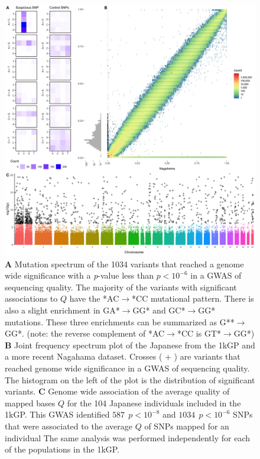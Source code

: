 \documentclass[9pt,lineno]{elife}
\begin{document}
\begin{figure}
\includegraphics[width=\hsize,keepaspectratio]{./Figures/Figure1.jpg}
\caption{
\textbf{A} 
Mutation spectrum of the 1034 variants that reached a genome wide significance with a \textit{p}-value less than $p < 10^{-6}$  in a GWAS of sequencing quality. 
The majority of the variants with significant associations to $Q$ have the *AC${\rightarrow}$*CC mutational pattern. There is also a slight enrichment in GA*${\rightarrow}$GG* and GC*${\rightarrow}$GG* mutations. These three enrichments can be summarized as G**${\rightarrow}$GG*. (note: the reverse complement of *AC${\rightarrow}$*CC is GT*${\rightarrow}$GG*)
\textbf{B} 
Joint frequency spectrum plot of the Japanese from the 1kGP and a more recent Nagahama dataset.
Crosses ( + ) are variants that reached genome wide significance in a GWAS of sequencing quality. 
The histogram on the left of the plot is the distribution of significant variants. 
\textbf{C} 
Genome wide association of the average quality of mapped bases $Q$ for the 104 Japanese individuals included in the 1kGP. This GWAS identified $587\ \  p < 10^{-8}$ and $1034\ \ p < 10^{-6}$ SNPs that were associated to the average $Q$ of SNPs mapped for an individual
The same analysis was performed independently for each of the populations in the 1kGP. }
 \label{SFS}
\end{figure}
\end{document}
